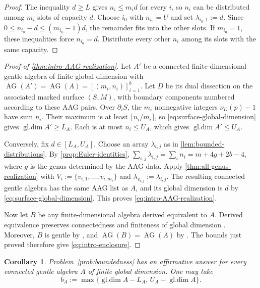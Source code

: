 \documentclass[11pt]{amsart}
\theoremstyle{definition}
\theoremstyle{plain}
\newtheorem{corollary}[corollary]{Corollary}
\theoremstyle{definition}
\theoremstyle{definition}
\newcommand{\gldim}{\operatorname{gl.dim}}
\newcommand{\AG}{\operatorname{AG}}
\begin{document}
\begin{proof}
The inequality $d\geq L$ gives $n_i\leq m_id$ for every $i$, so $n_i$ can be
distributed among $m_i$ slots of capacity $d$.  Choose $i_0$ with
$n_{i_0}=U$ and set $\lambda_{i_0,1}:=d$.  Since
$0\leq n_{i_0}-d\leq(m_{i_0}-1)d$, the remainder fits into the other slots.
If $m_{i_0}=1$, these inequalities force $n_{i_0}=d$.  Distribute every other
$n_i$ among its slots with the same capacity.
\end{proof}

\begin{proof}[Proof of \cref{thm:intro-AAG-realization}]
Let $A'$ be a connected finite-dimensional gentle algebra of finite
global dimension with $\AG(A')=\AG(A)=[(m_i,n_i)]_{i=1}^b$.
Let $D$ be its dual dissection on the associated marked surface
$(S,M)$, with boundary components numbered according to these
AAG pairs.
Over $\partial_iS$, the $m_i$ nonnegative integers $\nu_D(p)-1$ have sum
$n_i$.  Their maximum is at least $\lceil n_i/m_i\rceil$, so
\eqref{eq:surface-global-dimension} gives $\gldim A'\geq L_A$.  Each is at most
$n_i\leq U_A$, which gives $\gldim A'\leq U_A$.

Conversely, fix $d\in[L_A,U_A]$.  Choose an array
$\lambda_{i,j}$ as in \cref{lem:bounded-distributions}.  By
\cref{prop:Euler-identities},
$\sum_{i,j}\lambda_{i,j}=\sum_i n_i=m+4g+2b-4$, where $g$ is the genus
determined by the AAG data.  Apply \cref{thm:all-genus-realization} with
$V_i:=\{v_{i,1},\ldots,v_{i,m_i}\}$ and
$\lambda_{v_{i,j}}:=\lambda_{i,j}$.  The resulting connected gentle algebra
has the same AAG list as $A$, and its global dimension is $d$ by
\eqref{eq:surface-global-dimension}.  This proves
\eqref{eq:intro-AAG-realization}.

Now let $B$ be any finite-dimensional algebra derived equivalent
to $A$. Derived equivalence preserves connectedness and
finiteness of global dimension \cite{KellerKrause,Rickard}.
Moreover, $B$ is gentle by \cite{SchroerZimmermann}, and
$\AG(B)=\AG(A)$ by \cite{AvellaAlaminosGeiss}.
The bounds just proved therefore give
\eqref{eq:intro-enclosure}.
\end{proof}


\begin{corollary}
\label{cor:gentle-boundedness}
Problem~\ref{prob:boundedness} has an affirmative answer for every connected
gentle algebra $A$ of finite global dimension.  One may take
\[
 b_A:=\max\{\gldim A-L_A,\,U_A-\gldim A\}.
\]
\end{corollary}
\end{document}
